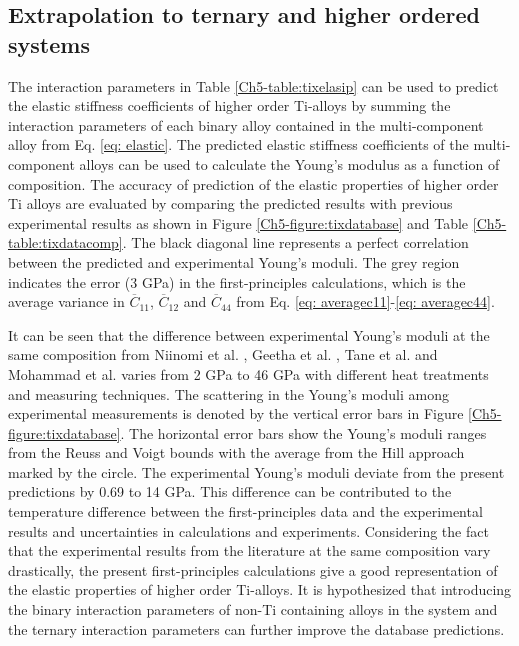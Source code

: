 \subsection{Extrapolation to ternary and higher ordered systems}

The interaction parameters in Table \ref{Ch5-table:tixelasip} can be used to predict the elastic stiffness coefficients of higher order Ti-alloys by summing the interaction parameters of each binary alloy contained in the multi-component alloy from Eq. \ref{eq: elastic}. The predicted elastic stiffness coefficients of the multi-component alloys can be used to calculate the Young's modulus as a function of composition. The accuracy of prediction of the elastic properties of higher order Ti alloys are evaluated by comparing the predicted results with previous experimental results \cite{Niinomi2012,Tane2010a,Geetha2009,Mohammed2014} as shown in Figure \ref{Ch5-figure:tixdatabase} and Table \ref{Ch5-table:tixdatacomp}. The black diagonal line represents a perfect correlation between the predicted and experimental Young's moduli. The grey region indicates the error (3 GPa) in the first-principles calculations, which is the average variance in $\overline{C}_{11}$, $\overline{C}_{12}$ and $\overline{C}_{44}$ from Eq. \ref{eq: averagec11}-\ref{eq: averagec44}. 

It can be seen that the difference between experimental Young's moduli at the same composition from Niinomi et al. \cite{Niinomi2012}, Geetha et al. \cite{Geetha2009}, Tane et al. \cite{Tane2010a} and Mohammad et al. \cite{Mohammed2014} varies from 2 GPa to 46 GPa with different heat treatments and measuring techniques. The scattering in the Young's moduli among experimental measurements is denoted by the vertical error bars in Figure \ref{Ch5-figure:tixdatabase}. The horizontal error bars show the Young's moduli ranges from the Reuss and Voigt bounds with the average from the Hill approach marked by the circle. The experimental Young's moduli deviate from the present predictions by 0.69 to 14 GPa. This difference can be contributed to the temperature difference between the first-principles data and the experimental results and uncertainties in calculations and experiments. Considering the fact that the experimental results from the literature at the same composition vary drastically, the present first-principles calculations give a good representation of the elastic properties of higher order Ti-alloys. It is hypothesized that introducing the binary interaction parameters of non-Ti containing alloys in the system and the ternary interaction parameters can further improve the database predictions. 

